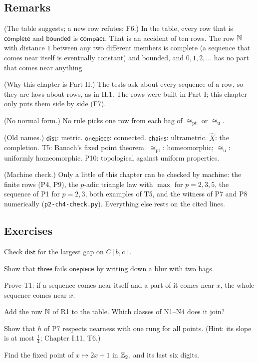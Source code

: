 \subsection*{Remarks}

\begin{lines}
\item[\lab{R1}] (The table suggests; a new row refutes; F6.) In the table, every row that is $\mathsf{complete}$ and $\mathsf{bounded}$ is $\mathsf{compact}$. That is an accident of ten rows. The row $\mathbb{N}$ with distance $1$ between any two different members is complete (a sequence that comes near itself is eventually constant) and bounded, and $0, 1, 2, \dots$ has no part that comes near anything.
\item[\lab{R2}] (Why this chapter is Part II.) The tests ask about every sequence of a row, so they are laws about rows, as in II.1. The rows were built in Part I; this chapter only puts them side by side (F7).
\item[\lab{R3}] (No normal form.) No rule picks one row from each bag of $\cong_{\mathrm{pt}}$ or $\cong_{\mathrm{u}}$.
\item[\lab{R4}] (Old names.) $\mathsf{dist}$: metric. $\mathsf{onepiece}$: connected. $\mathsf{chains}$: ultrametric. $\widehat X$: the completion. T5: Banach's fixed point theorem. $\cong_{\mathrm{pt}}$: homeomorphic; $\cong_{\mathrm{u}}$: uniformly homeomorphic. P10: topological against uniform properties.
\item[\lab{R5}] (Machine check.) Only a little of this chapter can be checked by machine: the finite rows (P4, P9), the $p$-adic triangle law with $\max$ for $p = 2, 3, 5$, the sequence of P1 for $p = 2, 3$, both examples of T5, and the witness of P7 and P8 numerically (\texttt{p2-ch4-check.py}). Everything else rests on the cited lines.
\end{lines}

\subsection*{Exercises}

\begin{lines}
\item[\lab{E1}] Check $\mathsf{dist}$ for the largest gap on $C[b,c]$.
\item[\lab{E2}] Show that $\mathsf{three}$ fails $\mathsf{onepiece}$ by writing down a blur with two bags.
\item[\lab{E3}] Prove T1: if a sequence comes near itself and a part of it comes near $x$, the whole sequence comes near $x$.
\item[\lab{E4}] Add the row $\mathbb{N}$ of R1 to the table. Which classes of N1--N4 does it join?
\item[\lab{E5}] Show that $h$ of P7 respects nearness with one rung for all points. (Hint: its slope is at most $\tfrac14$; Chapter I.11, T6.)
\item[\lab{E6}] Find the fixed point of $x \mapsto 2x + 1$ in $\mathbb{Z}_2$, and its last six digits.
\end{lines}

